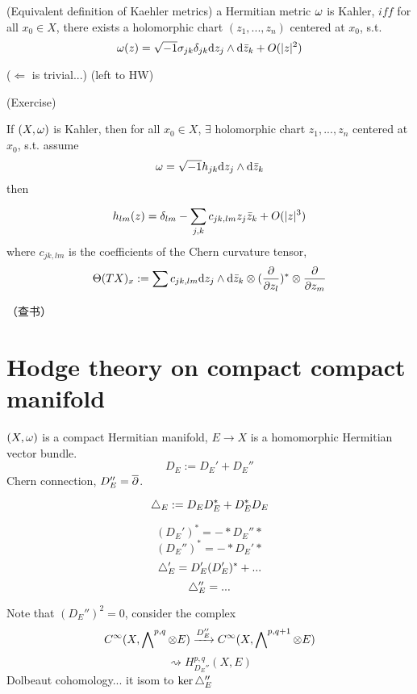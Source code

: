 \begin{prop}(Equivalent definition of Kaehler metrics)
a Hermitian metric $\omega$ is Kahler, $iff$
for all $x_0\in X$, there exists a holomorphic chart $(z_1,...,z_n)$ 
centered at $x_0$, s.t. 
$$\omega(z)=\sqrt{-1}\sigma_{jk}\delta_{jk}\mathrm{d} z_j\wedge\mathrm{d}\bar{z}_k
+O(|z|^2)
$$
\end{prop}

($\Leftarrow$ is trivial...)
(left to HW)

\begin{thm}(Exercise)

If $(X,\omega)$ is Kahler, then for all $x_0\in X$, 
$\exists$ holomorphic chart $z_1,...,z_n$ centered at $x_0$, s.t.
assume
$$\omega=\sqrt{-1}h_{jk}\mathrm{d} z_j\wedge\mathrm{d}\bar{z}_k$$
then

$$h_{lm}(z)=\delta_{lm}-\sum_{j,k}c_{jk,lm}z_j\bar{z}_k+O(|z|^3)$$
where $c_{jk,lm}$ is the coefficients of the Chern curvature tensor,
$$\Theta(TX)_{x}:=\sum c_{jk,lm}\mathrm{d} z_j\wedge\mathrm{d}\bar{z}_k\otimes(\frac{\partial } {\partial z_l})^*\otimes
\frac{\partial } {\partial z_m}$$
\end{thm}
（查书）

\section{Hodge theory on compact compact manifold}

$(X,\omega)$ is a compact Hermitian manifold, 
$E\to X$ is a homomorphic Hermitian vector bundle.
$$D_E:=D_E'+D_E''$$
Chern connection, $D_E''=\overline{\partial}$.

\begin{definition}
$$\triangle_E:=D_ED_E^*+D_E^*D_E$$
\end{definition}
$$(D_E')^*=-*D_E''*$$
$$(D_E'')^*=-*D_E'*$$
$$\triangle_E'=D_E'(D_E')^*+...$$
$$\triangle_E''=...$$

Note that $(D_E'')^2=0$, consider the complex 
$$C^\infty(X,\bigwedge\nolimits^{p,q}\otimes E)\xrightarrow{D_E''}C^\infty(X,\bigwedge\nolimits^{p,q+1}\otimes E)$$
$$\rightsquigarrow H^{p,q}_{D_E''}(X,E)$$
Dolbeaut cohomology...
it isom to $\ker\triangle_E''$











